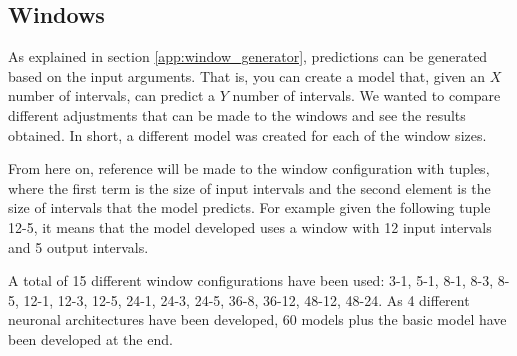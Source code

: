 \subsection{Windows}\label{window_ar}

As explained in section \ref{app:window_generator}, predictions can be generated based on the input arguments. That is, you can create a model that, given an $X$ number of intervals, can predict a $Y$ number of intervals. We wanted to compare different adjustments that can be made to the windows and see the results obtained. In short, a different model was created for each of the window sizes.
\newline


From here on, reference will be made to the window configuration with tuples, where the first term is the size of input intervals and the second element is the size of intervals that the model predicts. For example given the following tuple 12-5, it means that the model developed uses a window with 12 input intervals and 5 output intervals.
\newline


A total of 15 different window configurations have been used: 3-1, 5-1, 8-1, 8-3, 8-5, 12-1, 12-3, 12-5, 24-1, 24-3, 24-5, 36-8, 36-12, 48-12, 48-24. As 4 different neuronal architectures have been developed, 60 models plus the basic model have been developed at the end.
\newline
